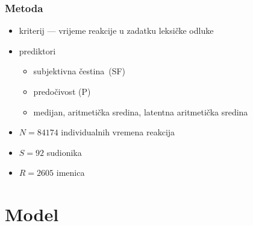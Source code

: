 \documentclass[aspectratio=169]{beamer}
\begin{document}
    \begin{frame}
        \frametitle{Metoda}

        \begin{itemize}
            \setlength{\itemsep}{2em}

            \item kriterij --- vrijeme reakcije u zadatku leksičke odluke

            \pause

            \item prediktori

                \begin{itemize}

                    \item subjektivna čestina (SF)

                    \pause

                    \item predočivost (P)

                    \pause

                    \item medijan, aritmetička sredina, latentna aritmetička
                        sredina

                \end{itemize}
        \end{itemize}
    \end{frame}
\endgroup

\begin{frame}
    \begin{itemize}
        \setlength{\itemsep}{1.5em}

        \item \(N = 84174\) individualnih vremena reakcija

        \item \(S = 92\) sudionika

        \item \(R = 2605\) imenica
        
    \end{itemize}
\end{frame}

\section{Model}

\begingroup
\end{document}
